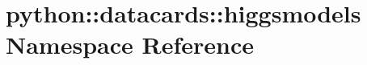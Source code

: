 \hypertarget{namespacepython_1_1datacards_1_1higgsmodels}{
\section{python::datacards::higgsmodels Namespace Reference}
\label{namespacepython_1_1datacards_1_1higgsmodels}
}
